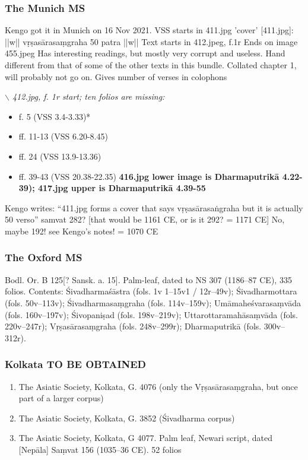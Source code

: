 \documentclass[11pt]{article}
\begin{document}
\subsubsection{The Munich MS}
\label{sec:orgb6d199b}
Kengo got it in Munich on 16 Nov 2021. VSS starts in 411.jpg
'cover' [411.jpg]: ||w|| vṛṣasārasaṃgraha 50 patra ||w||
Text starts in 412.jpeg, f.1r 
Ends on image 455.jpeg
Has interesting readings, but mostly very corrupt and useless.
Hand different from that of some of the other texts in this bundle.
Collated chapter 1, will probably not go on. Gives number of verses in colophons

\emph{\msM$\backslash$ 412.jpg, f. 1r start; ten folios are missing:}
\begin{itemize}
\item f. 5 (VSS 3.4-3.33)*
\item ff. 11-13 (VSS 6.20-8.45)
\item ff. 24 (VSS 13.9-13.36)
\item ff. 39-43 (VSS 20.38-22.35)
\textbf{416.jpg lower image is Dharmaputrikā 4.22-39); 
 417.jpg upper is Dharmaputrikā 4.39-55}
\end{itemize}
Kengo writes: ``411.jpg forms a cover that says vṛṣasārasaṅgraha
			but it is actually 50 verso''
samvat 282? [that would be 1161 CE, or is it 292? = 1171 CE] 
No, maybe 192! see Kengo's notes! = 1070 CE
\subsubsection{The Oxford MS}
\label{sec:orgcf5dac5}
 Bodl. Or. B 125[? Sansk. a. 15]. Palm-leaf, dated to NS 307 (1186--87 CE), 335 folios. Contents: Śivadharmaśāstra 
(fols. 1v 1--15v1 / 12r--49v); Śivadharmottara (fols. 50v--113v); Śivadharmasaṃgraha (fols. 114v--159v); 
Umāmaheśvarasaṃvāda (fols. 160v--197v); Śivopaniṣad (fols. 198v--219v); Uttarottaramahāsaṃvāda (fols. 
220v--247r); Vṛṣasārasaṃgraha (fols. 248v--299r); Dharmaputrikā (fols. 300v--312r). 

\subsubsection{Kolkata TO BE OBTAINED}
\label{sec:org32ef672}
\begin{enumerate}
\item The Asiatic Society, Kolkata, G. 4076 (only the Vṛṣasārasaṃgraha, but once part of a larger corpus)
\item The Asiatic Society, Kolkata, G. 3852 (Śivadharma corpus)
\item The Asiatic Society, Kolkata, G 4077. Palm leaf, Newari script, dated [Nepāla] Saṃvat 156 (1035--36 CE). 52 folios
\end{enumerate}
\end{document}
